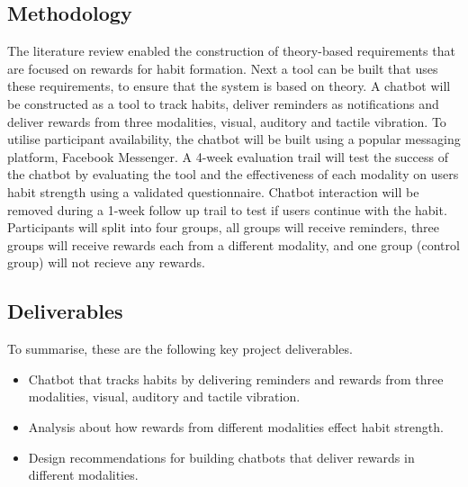 \subsection*{Methodology}
The literature review enabled the construction of theory-based requirements that are focused on rewards for habit formation. Next a tool can be built that uses these requirements, to ensure that the system is based on theory. A chatbot will be constructed as a tool to track habits, deliver reminders as notifications and deliver rewards from three modalities, visual, auditory and tactile vibration. To utilise participant availability, the chatbot will be built using a popular messaging platform, Facebook Messenger.\newline
\newline
A 4-week evaluation trail will test the success of the chatbot by evaluating the tool and the effectiveness of each modality on users habit strength using a validated questionnaire. Chatbot interaction will be removed during a 1-week follow up trail to test if users continue with the habit. Participants will split into four groups, all groups will receive reminders, three groups will receive rewards each from a different modality, and one group (control group) will not recieve any rewards.

\newpage
\subsection*{Deliverables}
To summarise, these are the following key project deliverables.

\begin{itemize}
  \item Chatbot that tracks habits by delivering reminders and rewards from three modalities, visual, auditory and tactile vibration.
  \item Analysis about how rewards from different modalities effect habit strength.
  \item Design recommendations for building chatbots that deliver rewards in different modalities.
\end{itemize}


